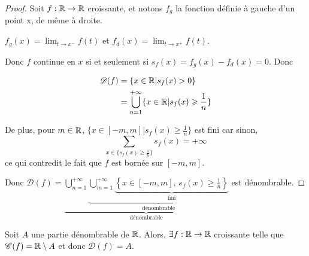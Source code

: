 \begin{proof}
    Soit $f : \mathbb{R} \to \mathbb{R}$ croissante, et notons $f_g$ la fonction définie à gauche d'un point x, de même à droite.

    $f_g(x) = \lim_{t \to x^-} f(t)$ et $f_d(x) = \lim_{t \to x^+} f(t)$.

    Donc $f$ continue en $x$ si et seulement si $s_f(x) = f_g(x) - f_d(x) = 0$. Donc 

    \begin{align*}
        \mathscr D(f) & = \{ x \in \mathbb{R} | s_f(x) > 0 \} \\
        & = \bigcup_{n=1}^{+\infty} \{ x \in \mathbb{R} | s_f(x) \geqslant \frac{1}{n} \}
    \end{align*}

    De plus, pour $m \in \mathbb{R}$, $\{ x \in [-m, m] | s_f(x) \geqslant \frac{1}{n} \}$ est fini car sinon,
    \[
        \sum_{x \in \{ s_f(x) \geqslant \frac{1}{n} \}} s_f(x) = +\infty
    \]
    ce qui contredit le fait que $f$ est bornée sur $[-m, m]$.

    Donc $\mathscr D(f) = \underbrace{\bigcup_{n=1}^{+\infty} \underbrace{ \bigcup_{m=1}^{+\infty} \underbrace{\left\{x \in [-m, m], \, s_f(x) \geqslant \frac 1 n\right\}}_{\text{fini}}}_{\text{dénombrable}}}_{\text{dénombrable}}$ est dénombrable.
\end{proof}

\begin{proposition}{}{}
    Soit $A$ une partie dénombrable de $\mathbb{R}$. Alors, $\exists f : \mathbb{R} \to \mathbb{R}$ croissante telle que 
    $\mathscr C(f) = \mathbb{R} \setminus A$ et donc $\mathscr D(f) = A$.
\end{proposition}

